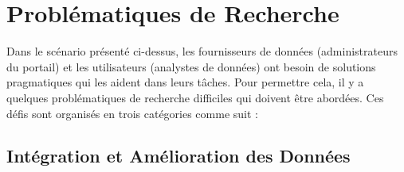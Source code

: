 \section{Probl\'{e}matiques de Recherche}

Dans le sc\'{e}nario pr\'{e}sent\'{e} ci-dessus, les fournisseurs de donn\'{e}es (administrateurs du portail) et les utilisateurs (analystes de donn\'{e}es) ont besoin de solutions pragmatiques qui les aident dans leurs tâches. Pour permettre cela, il y a quelques probl\'{e}matiques de recherche difficiles qui doivent être abord\'{e}es. Ces d\'{e}fis sont organis\'{e}s en trois cat\'{e}gories comme suit :

\subsection{Int\'{e}gration et Am\'{e}lioration des Donn\'{e}es}


